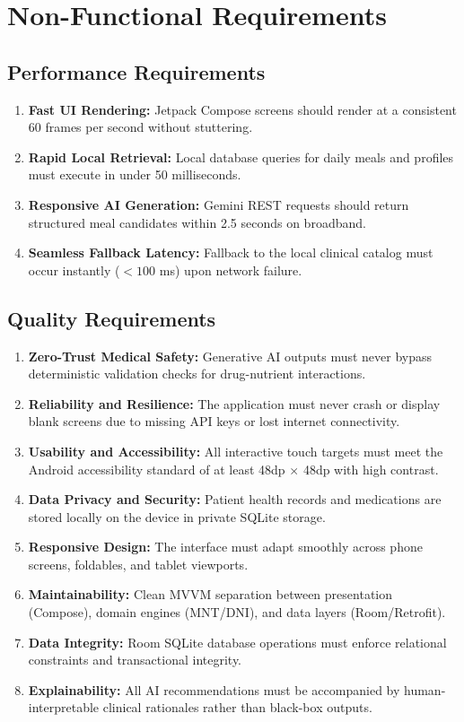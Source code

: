 \documentclass[a4paper,12pt]{report}
\begin{document}
\section{Non-Functional Requirements}

\subsection{Performance Requirements}
\begin{enumerate}
\item \textbf{Fast UI Rendering:} Jetpack Compose screens should render at a consistent 60 frames per second without stuttering.
\item \textbf{Rapid Local Retrieval:} Local database queries for daily meals and profiles must execute in under 50 milliseconds.
\item \textbf{Responsive AI Generation:} Gemini REST requests should return structured meal candidates within 2.5 seconds on broadband.
\item \textbf{Seamless Fallback Latency:} Fallback to the local clinical catalog must occur instantly ($<100$ ms) upon network failure.
\end{enumerate}

\subsection{Quality Requirements}
\begin{enumerate}
\item \textbf{Zero-Trust Medical Safety:}
Generative AI outputs must never bypass deterministic validation checks for drug-nutrient interactions.

\item \textbf{Reliability and Resilience:}
The application must never crash or display blank screens due to missing API keys or lost internet connectivity.

\item \textbf{Usability and Accessibility:}
All interactive touch targets must meet the Android accessibility standard of at least 48dp $\times$ 48dp with high contrast.

\item \textbf{Data Privacy and Security:}
Patient health records and medications are stored locally on the device in private SQLite storage.

\item \textbf{Responsive Design:}
The interface must adapt smoothly across phone screens, foldables, and tablet viewports.

\item \textbf{Maintainability:}
Clean MVVM separation between presentation (Compose), domain engines (MNT/DNI), and data layers (Room/Retrofit).

\item \textbf{Data Integrity:}
Room SQLite database operations must enforce relational constraints and transactional integrity.

\item \textbf{Explainability:}
All AI recommendations must be accompanied by human-interpretable clinical rationales rather than black-box outputs.
\end{enumerate}
\end{document}
